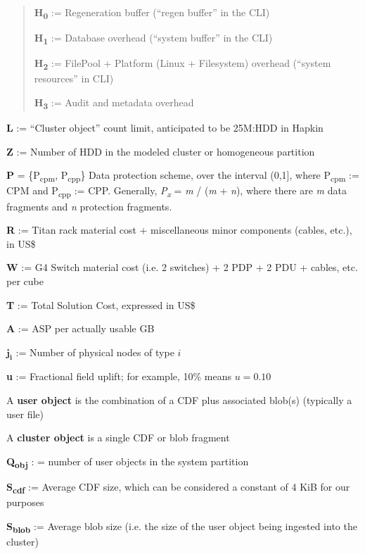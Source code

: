 \begin{quote}
\textbf{H}\textsubscript{\textbf{0}} := Regeneration buffer (``regen buffer'' in the CLI)

\textbf{H}\textsubscript{\textbf{1}} := Database overhead (``system buffer'' in the CLI)

\textbf{H}\textsubscript{\textbf{2}}\textbf{ }:= FilePool + Platform (Linux + Filesystem) overhead (``system resources'' in CLI)

\textbf{H}\textsubscript{\textbf{3}} := Audit and metadata overhead
\end{quote}

\textbf{L} := ``Cluster object'' count limit, anticipated to be 25M:HDD in Hapkin

\textbf{Z} := Number of HDD in the modeled cluster or homogeneous partition

\textbf{P} = \{P\textsubscript{cpm}, P\textsubscript{cpp}\} Data protection scheme, over the interval (0,1{]}, where P\textsubscript{cpm} := CPM and P\textsubscript{cpp} := CPP. Generally, \emph{P}\textsubscript{\emph{x}} = \emph{m} / (\emph{m} + \emph{n}), where there are \emph{m} data fragments and \emph{n} protection fragments.

\textbf{R} := Titan rack material cost + miscellaneous minor components (cables, etc.), in US\$

\textbf{W } := G4 Switch material cost (i.e. 2 switches) + 2 PDP + 2 PDU + cables, etc. per cube

\textbf{T} := Total Solution Cost, expressed in US\$

\textbf{A} := ASP per actually usable GB

\(\boldsymbol{j_i}\) := Number of physical nodes of type \(i\)

\textbf{u } := Fractional field uplift; for example, 10\% means \(u=0.10\)

A \textbf{user object} is the combination of a CDF plus associated blob(s) (typically a user file)

A \textbf{cluster object} is a single CDF or blob fragment

\textbf{Q}\textsubscript{\textbf{obj}} : = number of user objects in the system partition

\textbf{S}\textsubscript{\textbf{cdf}} := Average CDF size, which can be considered a constant of 4 KiB for our purposes

\textbf{S}\textsubscript{\textbf{blob}} := Average blob size (i.e. the size of the user object being ingested into the cluster)

